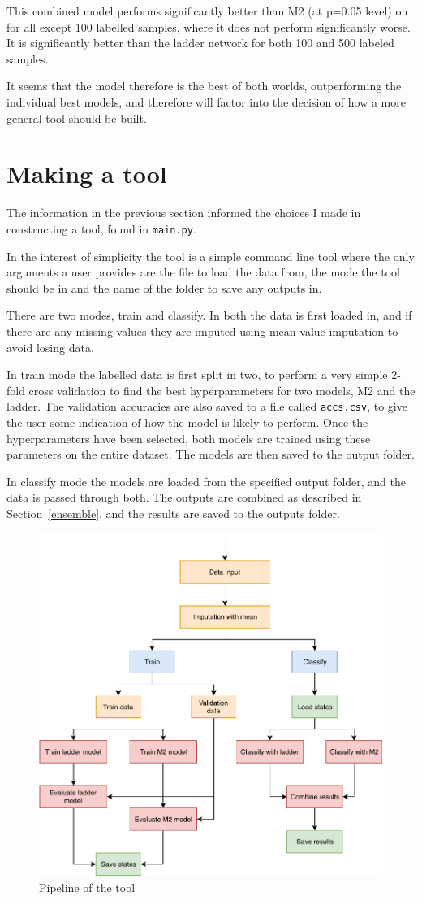 This combined model performs significantly better than M2 (at p=0.05 level) on for all except 100 labelled samples, where it does not 
perform significantly worse. It is significantly better than the ladder network for both 100 and 500 labeled samples. 

It seems that the model therefore is the best of both worlds, outperforming the individual best models, and therefore will factor into 
the decision of how a more general tool should be built.

\section{Making a tool} \label{tool}

The information in the previous section informed the choices I made in constructing a tool, found in \texttt{main.py}.

In the interest of simplicity the tool is a simple command line tool where the  only arguments a user provides are the file to load the data 
from, the mode the tool should be in and the name of the folder to save any outputs in.

There are two modes, train and classify. In both the data is first loaded in, and if there are any missing values they are imputed using 
mean-value imputation to avoid losing data.

In train mode the labelled data is first split in two, to perform a very simple 2-fold cross validation to find the best hyperparameters for two 
models, M2 and the ladder. The validation accuracies are also saved to a file called \texttt{accs.csv}, to give the user some indication of
how the model is likely to perform.
Once the hyperparameters have been selected, both models are trained using these parameters on the entire dataset. The models are then 
saved to the output folder.

In classify mode the models are loaded from the specified output folder, and the data is passed through both. The outputs are combined 
as described in Section~\ref{ensemble}, and the results are saved to the outputs folder.

\begin{figure}[H]
  \centering
  \includegraphics[scale=1]{figs/tool.pdf}
  \caption{Pipeline of the tool}
  \label{fig:pipeline}
\end{figure}